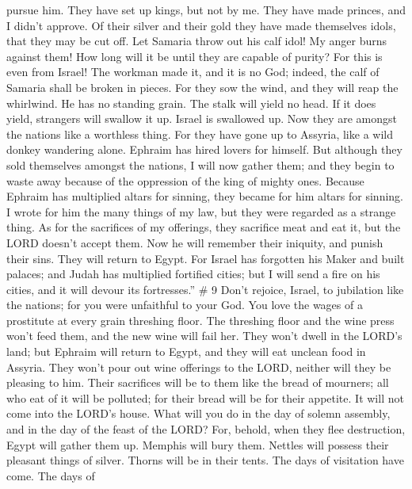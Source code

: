 pursue him.  They have set up kings, but not by me. They
have made princes, and I didn't approve. Of their silver and their gold
they have made themselves idols, that they may be cut off. 
Let Samaria throw out his calf idol! My anger burns against them! How
long will it be until they are capable of purity?  For this
is even from Israel! The workman made it, and it is no God; indeed, the
calf of Samaria shall be broken in pieces.  For they sow the
wind, and they will reap the whirlwind. He has no standing grain. The
stalk will yield no head. If it does yield, strangers will swallow it
up.  Israel is swallowed up. Now they are amongst the
nations like a worthless thing.  For they have gone up to
Assyria, like a wild donkey wandering alone. Ephraim has hired lovers
for himself.  But although they sold themselves amongst the
nations, I will now gather them; and they begin to waste away because of
the oppression of the king of mighty ones.  Because Ephraim
has multiplied altars for sinning, they became for him altars for
sinning.  I wrote for him the many things of my law, but
they were regarded as a strange thing.  As for the
sacrifices of my offerings, they sacrifice meat and eat it, but the LORD
doesn't accept them. Now he will remember their iniquity, and punish
their sins. They will return to Egypt.  For Israel has
forgotten his Maker and built palaces; and Judah has multiplied
fortified cities; but I will send a fire on his cities, and it will
devour its fortresses.'' \# 9  Don't rejoice, Israel, to
jubilation like the nations; for you were unfaithful to your God. You
love the wages of a prostitute at every grain threshing floor.
 The threshing floor and the wine press won't feed them, and
the new wine will fail her.  They won't dwell in the LORD's
land; but Ephraim will return to Egypt, and they will eat unclean food
in Assyria.  They won't pour out wine offerings to the LORD,
neither will they be pleasing to him. Their sacrifices will be to them
like the bread of mourners; all who eat of it will be polluted; for
their bread will be for their appetite. It will not come into the LORD's
house.  What will you do in the day of solemn assembly, and
in the day of the feast of the LORD?  For, behold, when they
flee destruction, Egypt will gather them up. Memphis will bury them.
Nettles will possess their pleasant things of silver. Thorns will be in
their tents.  The days of visitation have come. The days of
